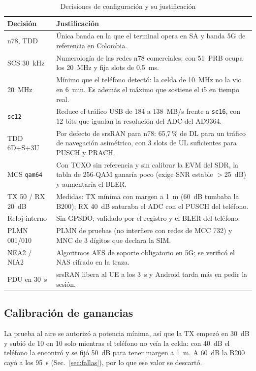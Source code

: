 \documentclass[conference]{IEEEtran}
\begin{document}
\begin{table}[!t]
\caption{Decisiones de configuración y su justificación}
\label{tab:decisiones}
\centering
\footnotesize
\renewcommand{\arraystretch}{1.1}
\begin{tabular}{p{1.75cm}p{6.25cm}}
\toprule
\textbf{Decisión} & \textbf{Justificación} \\
\midrule
n78, TDD & Única banda en la que el terminal opera en SA y banda 5G de referencia en Colombia. \\
SCS 30~kHz & Numerología de las redes n78 comerciales; con 51~PRB ocupa los 20~MHz y fija slots de 0{,}5~ms. \\
20~MHz & Mínimo que el teléfono detectó: la celda de 10~MHz no la vio en 6~min. Es además el máximo que sostiene el i5 en tiempo real. \\
\texttt{sc12} & Reduce el tráfico USB de 184 a 138~MB/s frente a \texttt{sc16}, con 12 bits que igualan la resolución del ADC del AD9364. \\
TDD 6D+S+3U & Por defecto de srsRAN para n78: 65{,}7\,\% de DL para un tráfico de navegación asimétrico, con 3 slots de UL suficientes para PUSCH y PRACH. \\
MCS \texttt{qam64} & Con TCXO sin referencia y sin calibrar la EVM del SDR, la tabla de 256-QAM ganaría poco (exige SNR estable $>$25~dB) y aumentaría el BLER. \\
TX 50 / RX 20~dB & Medidas: TX mínima con margen a 1~m (60~dB tumbaba la B200); RX 40~dB saturaba el ADC con el PUSCH del teléfono. \\
Reloj interno & Sin GPSDO; validado por el registro y el BLER del teléfono. \\
PLMN 001/010 & PLMN de pruebas (no interfiere con redes de MCC 732) y MNC de 3 dígitos que declara la SIM. \\
NEA2 / NIA2 & Algoritmos AES de soporte obligatorio en 5G; se verificó el NAS cifrado en la traza. \\
PDU en 30~s & srsRAN libera al UE a los 3~s y Android tarda más en pedir la sesión. \\
\bottomrule
\end{tabular}
\end{table}

\subsection{Calibración de ganancias}
La prueba al aire se autorizó a potencia mínima, así que la TX empezó en 30~dB y subió de 10 en 10 solo mientras el teléfono no veía la celda: con 40~dB el teléfono la encontró y se fijó 50~dB para tener margen a 1~m. A 60~dB la B200 cayó a los 95~s (Sec.~\ref{sec:fallas}), por lo que ese valor se descartó.
\end{document}
